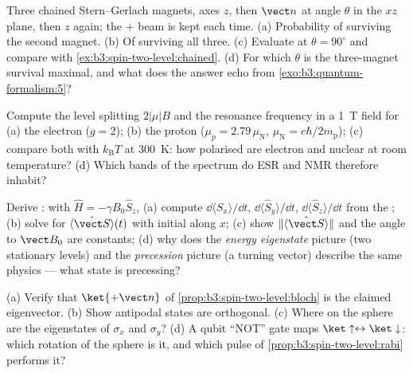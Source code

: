 \begin{exercise}[$\star$]\label{exo:b3:spin-two-level:3}
Three chained Stern--Gerlach magnets, axes $z$, then $\vect n$ at
angle $\theta$ in the $xz$ plane, then $z$ again; the $+$ beam is
kept each time. (a) Probability of surviving the second magnet. (b)
Of surviving all three. (c) Evaluate at $\theta = 90^\circ$ and
compare with \cref{ex:b3:spin-two-level:chained}. (d) For which
$\theta$ is the three-magnet survival maximal, and what does the
answer echo from \cref{exo:b3:quantum-formalism:5}?
\end{exercise}

\begin{exercise}[$\star$]\label{exo:b3:spin-two-level:4}
Compute the level splitting $2|\mu|B$ and the resonance frequency
in a \qty{1}{T} field for (a) the electron ($g = 2$); (b) the
proton ($\mu_p = 2.79\,\mu_{\text{N}}$, $\mu_{\text{N}} =
e\hbar/2m_{\text{p}}$); (c) compare both with $k_{\text{B}}T$ at
\qty{300}{K}: how polarised are electron and nuclear  at room
temperature? (d) Which bands of the spectrum do ESR and NMR
therefore inhabit?
\end{exercise}

\begin{exercise}[$\star\star$]\label{exo:b3:spin-two-level:5}
Derive : with $\hat H = -\gamma B_0\hat S_z$, (a)
compute $\dd\langle\hat S_x\rangle/\dd t$, $\dd\langle\hat
S_y\rangle/\dd t$, $\dd\langle\hat S_z\rangle/\dd t$ from the
; (b) solve for $\langle\hat{\vect S}\rangle(t)$ with
initial  along $x$; (c) show $\|\langle\hat{\vect S}\rangle\|$
and the angle to $\vect B_0$ are constants; (d) why does the
\emph{energy eigenstate} picture (two stationary levels) and the
\emph{precession} picture (a turning vector) describe the same
physics --- what state is precessing?
\end{exercise}

\begin{exercise}[$\star\star$]\label{exo:b3:spin-two-level:6}
(a) Verify that $\ket{+\vect n}$ of
\cref{prop:b3:spin-two-level:bloch} is the claimed eigenvector. (b)
Show antipodal states are orthogonal. (c) Where on the sphere are
the eigenstates of $\sigma_x$ and $\sigma_y$? (d) A qubit ``NOT''
gate maps $\ket\uparrow \leftrightarrow \ket\downarrow$: which
rotation of the sphere is it, and which pulse of
\cref{prop:b3:spin-two-level:rabi} performs it?
\end{exercise}


